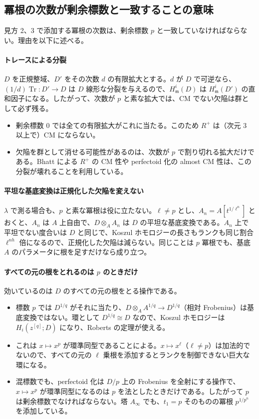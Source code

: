 \documentclass[11pt,a4paper]{ltjsarticle}
\numberwithin{equation}{section}
\theoremstyle{plain}
\theoremstyle{definition}
\theoremstyle{definition}
\newcommand{\m}{\mathfrak{m}}
\begin{document}
\subsection{冪根の次数が剰余標数と一致することの意味}\label{sec:intuition-p}

見方 2、3 で添加する冪根の次数は、剰余標数 $p$ と一致していなければならない。理由を以下に述べる。

\paragraph{トレースによる分裂}
$D$ を正規整域、$D'$ をその次数 $d$ の有限拡大とする。$d$ が $D$ で可逆なら、$(1/d)\operatorname{Tr}\colon D'\to D$ は $D$ 線形な分裂を与えるので、$H^i_\m(D)$ は $H^i_\m(D')$ の直和因子になる。したがって、次数が $p$ と素な拡大では、CM でない欠陥は群として必ず残る。
\begin{itemize}
  \item 剰余標数 $0$ では全ての有限拡大がこれに当たる。このため $R^+$ は（次元 $3$ 以上で）CM にならない。
  \item 欠陥を群として消せる可能性があるのは、次数が $p$ で割り切れる拡大だけである。Bhatt による $R^+$ の CM 性や perfectoid 化の almost CM 性は、この分裂が壊れることを利用している。
\end{itemize}

\paragraph{平坦な基底変換は正規化した欠陥を変えない}
$\lambda$ で測る場合も、$p$ と素な冪根は役に立たない。$\ell\neq p$ とし、$A_n = A[t^{1/\ell^n}]$ とおくと、$A_n$ は $A$ 上自由で、$D\otimes_A A_n$ は $D$ の平坦な基底変換である。$A_n$ 上で平坦でない度合いは $D$ と同じで、Koszul ホモロジーの長さもランクも同じ割合 $\ell^{nh}$ 倍になるので、正規化した欠陥は減らない。同じことは $p$ 冪根でも、基底 $A$ のパラメータに根を足すだけなら成り立つ。

\paragraph{すべての元の根をとれるのは $p$ のときだけ}
効いているのは $D$ のすべての元の根をとる操作である。
\begin{itemize}
  \item 標数 $p$ では $D^{1/q}$ がそれに当たり、$D\otimes_A A^{1/q}\to D^{1/q}$（相対 Frobenius）は基底変換ではない。環として $D^{1/q}\cong D$ なので、Koszul ホモロジーは $H_i(z^{[q]};D)$ になり、Roberts の定理が使える。
  \item これは $x\mapsto x^p$ が環準同型であることによる。$x\mapsto x^\ell$（$\ell\neq p$）は加法的でないので、すべての元の $\ell$ 乗根を添加するとランクを制御できない巨大な環になる。
  \item 混標数でも、perfectoid 化は $D/p$ 上の Frobenius を全射にする操作で、$x\mapsto x^p$ が環準同型になるのは $p$ を法としたときだけである。したがって $p$ は剰余標数でなければならない。塔 $A_\infty$ でも、$t_1 = p$ そのものの冪根 $p^{1/p^n}$ を添加している。
\end{itemize}
\end{document}
